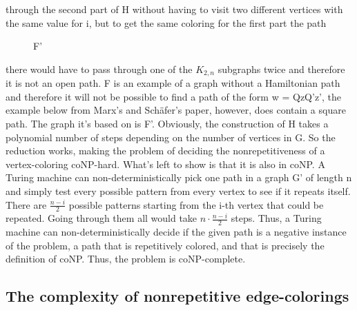 \documentclass[12pt,a4paper]{article}
\begin{document}
through the second part of H without having to visit two different vertices with 
the same value for i, but to get the same coloring for the first part the path \begin{wrapfigure}{l}{4cm}
	
	\caption{F'}
\end{wrapfigure}there would have to pass through one of the $K_{2,n}$ subgraphs twice and therefore it is not an open path. F is an example of a graph without a Hamiltonian path and therefore it will not be possible to find a path of the form w = QzQ'z', the example below from Marx's and Schäfer's paper, however, does contain a square path. The graph it's based on is F'. 
\newline
\newline
Obviously, the construction of H takes a polynomial number of steps depending on the number of vertices in G. So the reduction works, making the problem of deciding the nonrepetitiveness of a vertex-coloring coNP-hard. What's left to show is that it is also in coNP. A Turing machine can non-deterministically pick one path in a graph G' of length n and simply test every possible pattern from every vertex to see if it repeats itself. There are $\frac{n - i}{2}$ possible patterns starting from the i-th vertex that could be repeated. Going through them all would take $n \cdot \frac{n - i}{2}$ steps. Thus, a Turing machine can non-deterministically decide if the given path is a negative instance of the problem, a path that is repetitively colored, and that is precisely the definition of coNP. Thus, the problem is coNP-complete.

\subsection{The complexity of nonrepetitive edge-colorings}
\end{document}
